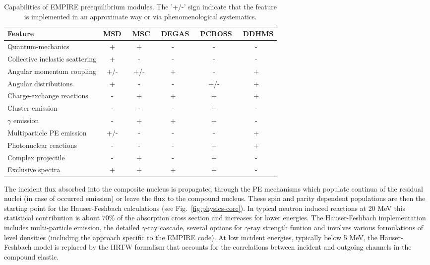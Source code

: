 \begin{table*}[tbp]
\caption{Capabilities of EMPIRE preequilibrium modules. The '+/-' sign
indicate that the feature is implemented in an approximate way or via
phenomenological systematics.}
\label{tbl:PEcapabilities}%
\begin{tabular}{lccccc}
\hline
\textbf{Feature} & \textbf{MSD } & \textbf{\ MSC } & \textbf{\ DEGAS } &
\textbf{\ PCROSS } & \textbf{\ DDHMS } \\ \hline
Quantum-mechanics & + & + & - & - & - \\
Collective inelastic scattering & + & - & - & - & - \\
Angular momentum coupling & +/- & +/- & + & - & + \\
Angular distributions & + & - & - & +/- & + \\
Charge-exchange reactions & - & + & + & + & + \\
Cluster emission & - & - & - & + & - \\
$\gamma$ emission & - & + & + & + & - \\
Multiparticle PE emission & +/- & - & - & - & + \\
Photonuclear reactions & - & - & - & + & + \\
Complex projectile & - & + & - & + & - \\
Exclusive spectra & + & + & + & + & - \\ \hline
\end{tabular}%
\end{table*}

The incident flux absorbed into the composite nucleus is propagated through
the PE mechanisms which populate continua of the residual nuclei (in case of
occurred emission) or leave the flux to the compound nucleus. These spin and
parity dependent populations are then the starting point for the
Hauser-Feshbach calculations (see Fig.~\ref{fig:physics-core}). In typical
neutron induced reactions at 20 MeV this statistical contribution is about
70\% of the absorption cross section and increases for lower energies. The
Hauser-Feshbach implementation includes multi-particle emission, the
detailed $\gamma $-ray cascade, several options for $\gamma $-ray strength
funtion and involves various formulations of level densities (including the
approach specific to the EMPIRE code). At low incident energies, typically
below 5 MeV, the Hauser-Feshbach model is replaced by the HRTW formalism
that accounts for the correlations between incident and outgoing channels in
the compound elastic.

